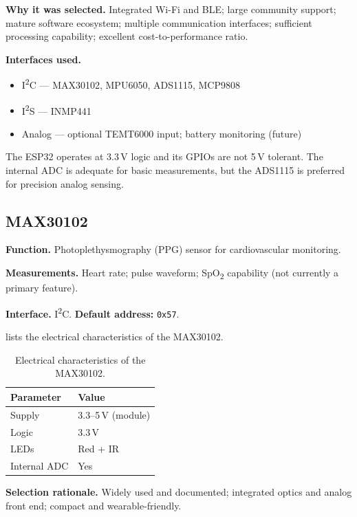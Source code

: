 \textbf{Why it was selected.} Integrated Wi-Fi and BLE; large community support; mature software ecosystem; multiple communication interfaces; sufficient processing capability; excellent cost-to-performance ratio.

\textbf{Interfaces used.}
\begin{itemize}
    \item I\textsuperscript{2}C --- MAX30102, MPU6050, ADS1115, MCP9808
    \item I\textsuperscript{2}S --- INMP441
    \item Analog --- optional TEMT6000 input; battery monitoring (future)
\end{itemize}

\begin{engnote}
The ESP32 operates at 3.3\,V logic and its GPIOs are not 5\,V tolerant. The internal ADC is adequate for basic measurements, but the ADS1115 is preferred for precision analog sensing.
\end{engnote}

\subsection{MAX30102}
\label{sec:max30102}

\textbf{Function.} Photoplethysmography (PPG) sensor for cardiovascular monitoring.

\textbf{Measurements.} Heart rate; pulse waveform; SpO\textsubscript{2} capability (not currently a primary feature).

\textbf{Interface.} I\textsuperscript{2}C. \textbf{Default address:} \texttt{0x57}.

 lists the electrical characteristics of the MAX30102.

\begin{table}[H]
\centering
\caption{Electrical characteristics of the MAX30102.}
\label{tab:max30102-elec}
\small
\begin{tabularx}{\columnwidth}{@{}l Y@{}}
\toprule
\textbf{Parameter} & \textbf{Value} \\
\midrule
Supply & 3.3--5\,V (module) \\
Logic & 3.3\,V \\
LEDs & Red + IR \\
Internal ADC & Yes \\
\bottomrule
\end{tabularx}
\end{table}

\textbf{Selection rationale.} Widely used and documented; integrated optics and analog front end; compact and wearable-friendly.

